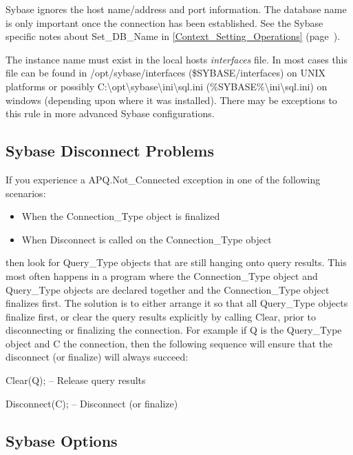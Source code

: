 \documentclass[english,letterpaper]{book}
\newcommand\Ref[1]{\textsection\ref{#1} (page~\pageref{#1})}
\begin{document}
Sybase ignores the host name/address and port information. The database
name is only important once the connection has been established. See
the Sybase specific notes about Set\_DB\_Name in \Ref{Context_Setting_Operations}.

The instance name must exist in the local hosts \emph{interfaces}
file. In most cases this file can be found in /opt/sybase/interfaces
(\$SYBASE/interfaces) on UNIX platforms or possibly C:\textbackslash{}opt\textbackslash{}sybase\textbackslash{}ini\textbackslash{}sql.ini
(\%SYBASE\%\textbackslash{}ini\textbackslash{}sql.ini) on windows
(depending upon where it was installed). There may be exceptions to
this rule in more advanced Sybase configurations.


\subsection{Sybase Disconnect Problems}

If you experience a APQ.Not\_Connected exception
in one of the following scenarios:

\begin{itemize}
   \item When the Connection\_Type object is finalized
   \item When Disconnect is called on the Connection\_Type object
\end{itemize}

then look for Query\_Type objects that are still hanging onto query
results. This most often happens in a program where the Connection\_Type
object and Query\_Type objects are declared together and the Connection\_Type
object finalizes first. The solution is to either arrange it so that
all Query\_Type objects finalize first, or clear the query results
explicitly by calling Clear, prior to disconnecting or finalizing
the connection. For example if Q is the Query\_Type object and C the
connection, then the following sequence will ensure that the disconnect
(or finalize) will always succeed:

\begin{Example}

   Clear(Q);      -- Release query results

   Disconnect(C); -- Disconnect (or finalize)

\end{Example}

\subsection{Sybase Options}
\end{document}
